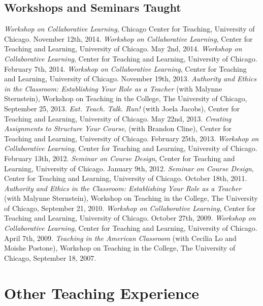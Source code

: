 \documentclass{resume}
\begin{document}
\subsection*{Workshops and Seminars Taught}
\begin{category}{}
\citembullet \emph{Workshop on Collaborative Learning}, Chicago Center for Teaching, University of Chicago. November 12th, 2014.
\citembullet \emph{Workshop on Collaborative Learning}, Center for Teaching and Learning, University of Chicago. May 2nd, 2014.
\citembullet \emph{Workshop on Collaborative Learning}, Center for Teaching and Learning, University of Chicago. February 7th, 2014.
\citembullet \emph{Workshop on Collaborative Learning}, Center for Teaching and Learning, University of Chicago. November 19th, 2013.
\citembullet \emph{Authority and Ethics in the Classroom: Establishing Your Role as a Teacher} (with Malynne Sternstein), Workshop on Teaching in the College, The University of Chicago, September 25, 2013.
\citembullet \emph{Eat. Teach. Talk. Run!} (with Joela Jacobs), Center for Teaching and Learning, University of Chicago. May 22nd, 2013.
\citembullet \emph{Creating Assignments to Structure Your Course}, (with Brandon Cline), Center for Teaching and Learning, University of Chicago. February 25th, 2013.
\citembullet \emph{Workshop on Collaborative Learning}, Center for Teaching and Learning, University of Chicago. February 13th, 2012.
\citembullet \emph{Seminar on Course Design}, Center for Teaching and Learning, University of Chicago. January 9th, 2012.
\citembullet \emph{Seminar on Course Design}, Center for Teaching and Learning, University of Chicago. October 18th, 2011.
\citembullet \emph{Authority and Ethics in the Classroom: Establishing Your Role as a Teacher} (with Malynne Sternstein), Workshop on Teaching in the College, The University of Chicago, September 21, 2010.
\citembullet \emph{Workshop on Collaborative Learning}, Center for Teaching and Learning, University of Chicago. October 27th, 2009.
\citembullet \emph{Workshop on Collaborative Learning}, Center for Teaching and Learning, University of Chicago. April 7th, 2009. 
\citembullet \emph{Teaching in the American Classroom} (with Cecilia Lo and Moishe Postone), Workshop on Teaching in the College, The University of Chicago, September 18, 2007.
\end{category}




\section*{\hspace{-1cm}Other Teaching Experience}
\end{document}
